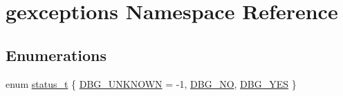 \hypertarget{namespacegexceptions}{}\section{gexceptions Namespace Reference}
\label{namespacegexceptions}
\subsection*{Enumerations}
\begin{DoxyCompactItemize}
\item 
enum \mbox{\hyperlink{namespacegexceptions_af9bff8ff1154a04a899276af806b8586}{status\+\_\+t}} \{ \mbox{\hyperlink{namespacegexceptions_af9bff8ff1154a04a899276af806b8586ae4db7c7ebf0745b6a50dca874c8eb0f7}{D\+B\+G\+\_\+\+U\+N\+K\+N\+O\+WN}} = -\/1, 
\mbox{\hyperlink{namespacegexceptions_af9bff8ff1154a04a899276af806b8586a7a9a6b0033804e09d661906434f757d2}{D\+B\+G\+\_\+\+NO}}, 
\mbox{\hyperlink{namespacegexceptions_af9bff8ff1154a04a899276af806b8586a065f682fca49b754e7b3f6a0d82a963f}{D\+B\+G\+\_\+\+Y\+ES}}
 \}
\end{DoxyCompactItemize}
